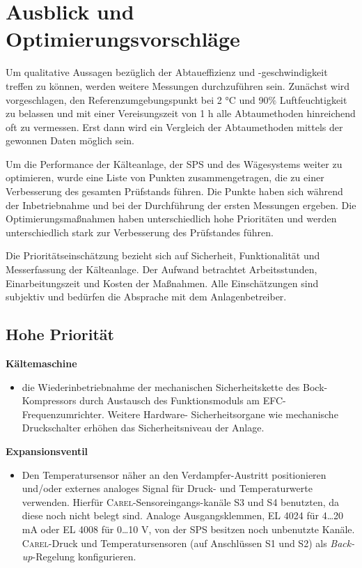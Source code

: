 \chapter{Ausblick und Optimierungsvorschläge}
\label{cha:Ausblick}
Um qualitative Aussagen bezüglich der Abtaueffizienz und -geschwindigkeit treffen zu können, werden weitere Messungen durchzuführen sein. Zunächst wird vorgeschlagen, den Referenzumgebungspunkt bei 2 °C und 90$\%$ Luftfeuchtigkeit zu belassen und mit einer Vereisungszeit von 1 h alle Abtaumethoden hinreichend oft zu vermessen. Erst dann wird ein Vergleich der Abtaumethoden mittels der gewonnen Daten möglich sein. 

Um die Performance der Kälteanlage, der SPS und des Wägesystems weiter zu optimieren, wurde eine Liste von Punkten zusammengetragen, die zu einer Verbesserung des gesamten Prüfstands führen. Die Punkte haben sich während der Inbetriebnahme und bei der Durchführung der ersten Messungen ergeben. Die Optimierungsmaßnahmen haben unterschiedlich hohe Prioritäten und werden unterschiedlich stark zur Verbesserung des Prüfstandes führen.

Die Prioritätseinschätzung bezieht sich auf Sicherheit, Funktionalität und Messerfassung der Kälteanlage. Der Aufwand betrachtet Arbeitsstunden, Einarbeitungszeit und Kosten der Maßnahmen. Alle Einschätzungen sind subjektiv und bedürfen die Absprache mit dem Anlagenbetreiber.


\section*{Hohe Priorität}

 \textbf{Kältemaschine}

\begin{itemize}
\item die Wiederinbetriebnahme der mechanischen Sicherheitskette des Bock-Kompressors durch Austausch des Funktionsmoduls am EFC-Frequenzumrichter. Weitere Hardware- Sicherheitsorgane wie mechanische Druckschalter erhöhen das Sicherheitsniveau der Anlage.
\end{itemize}	

\textbf{Expansionsventil}
	\begin{itemize}
	 \item Den Temperatursensor näher an den Verdampfer-Austritt positionieren und/oder externes analoges Signal für Druck- und Temperaturwerte  verwenden. Hierfür \textsc{Carel}-Sensoreingangs-kanäle S3 und S4 benutzten, da diese noch nicht belegt sind. Analoge Ausgangsklemmen, EL 4024 für 4\dots 20 mA oder EL 4008 für 0\dots 10 V, von der SPS besitzen noch unbenutzte Kanäle. \textsc{Carel}-Druck und Temperatursensoren (auf Anschlüssen S1 und S2) als \textit{Back-up}-Regelung konfigurieren.
	 \end{itemize}
	 
